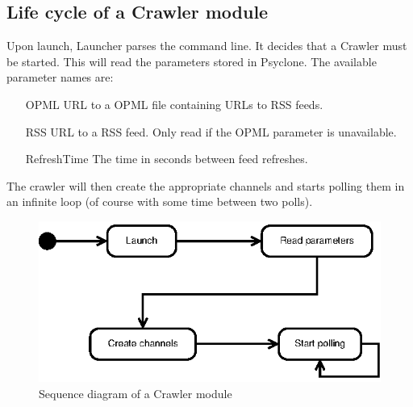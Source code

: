 \subsection{Life cycle of a Crawler module}

Upon launch, Launcher parses the command line. It decides that a Crawler must
be started. This will read the parameters stored in Psyclone. The available parameter names are:

\begin{itemize}
 \item[OPML] URL to a OPML file containing URLs to RSS feeds.
 \item[RSS] URL to a RSS feed. Only read if the OPML parameter is unavailable.
 \item[RefreshTime] The time in seconds between feed refreshes.
\end{itemize}

The crawler will then create the appropriate channels and starts polling them
in an infinite loop (of course with some time between two polls).

\begin{figure}[htp]
  \centering
  \includegraphics{design/image/sequence-diagram-crawler}
  \caption{Sequence diagram of a Crawler module}
\end{figure}
